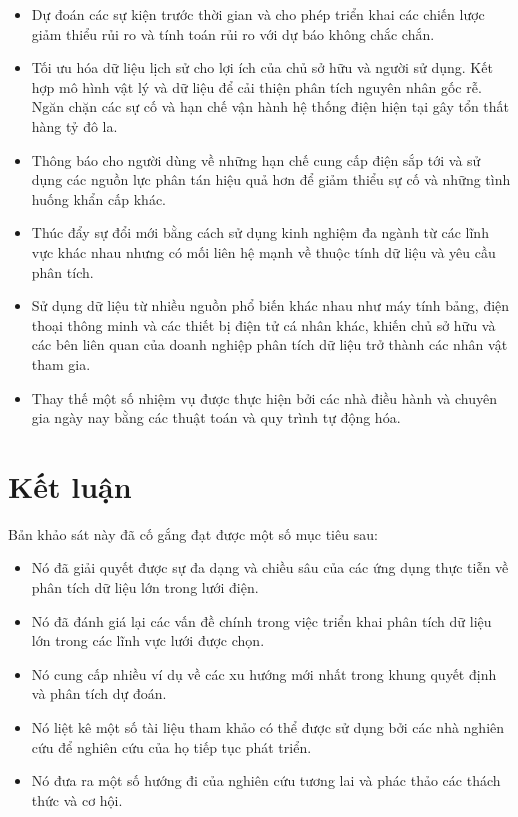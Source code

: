 \documentclass[utf8]{frontiersSCNS} %
\begin{document}
\begin{itemize}
\item Dự đoán các sự kiện trước thời gian và cho phép triển khai các chiến lược giảm thiểu rủi ro và tính toán rủi ro với dự báo không chắc chắn.

\item Tối ưu hóa dữ liệu lịch sử cho lợi ích của chủ sở hữu và người sử dụng. Kết hợp mô hình vật lý và dữ liệu để cải thiện phân tích nguyên nhân gốc rễ. Ngăn chặn các sự cố và hạn chế vận hành hệ thống điện hiện tại gây tổn thất hàng tỷ đô la.

\item Thông báo cho người dùng về những hạn chế cung cấp điện sắp tới và sử dụng các nguồn lực phân tán hiệu quả hơn để giảm thiểu sự cố và những tình huống khẩn cấp khác.

\item Thúc đẩy sự đổi mới bằng cách sử dụng kinh nghiệm đa ngành từ các lĩnh vực khác nhau nhưng có mối liên hệ mạnh về thuộc tính dữ liệu và yêu cầu phân tích.

\item Sử dụng dữ liệu từ nhiều nguồn phổ biến khác nhau như máy tính bảng, điện thoại thông minh và các thiết bị điện tử cá nhân khác, khiến chủ sở hữu và các bên liên quan của doanh nghiệp phân tích dữ liệu trở thành các nhân vật tham gia.

\item Thay thế một số nhiệm vụ được thực hiện bởi các nhà điều hành và chuyên gia ngày nay bằng các thuật toán và quy trình tự động hóa.
\end{itemize}




\section{Kết luận}

Bản khảo sát này đã cố gắng đạt được một số mục tiêu sau:
\begin{itemize}
\item Nó đã giải quyết được sự đa dạng và chiều sâu của các ứng dụng thực tiễn về phân tích dữ liệu lớn trong lưới điện.
\item Nó đã đánh giá lại các vấn đề chính trong việc triển khai phân tích dữ liệu lớn trong các lĩnh vực lưới được chọn.
\item Nó cung cấp nhiều ví dụ về các xu hướng mới nhất trong khung quyết định và phân tích dự đoán.
\item Nó liệt kê một số tài liệu tham khảo có thể được sử dụng bởi các nhà nghiên cứu để nghiên cứu của họ tiếp tục phát triển.
\item Nó đưa ra một số hướng đi của nghiên cứu tương lai và phác thảo các thách thức và cơ hội.

\end{itemize}
\end{document}
